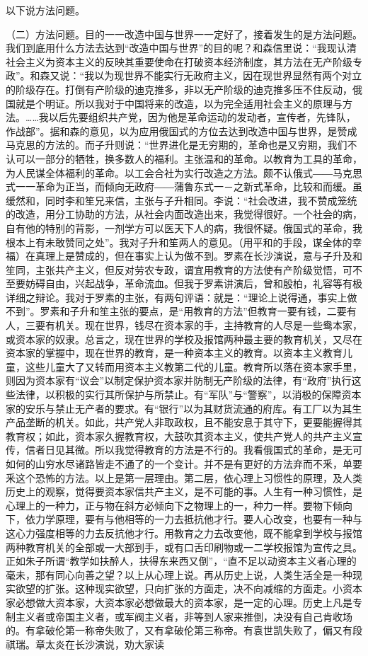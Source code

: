 以下说方法问题。

（二）方法问题。目的一一改造中国与世界一一定好了，接着发生的是方法问题。我们到底用什么方法去达到“改造中国与世界”的目的呢？和森信里说：“我现认清社会主义为资本主义的反映其重要使命在打破资本经济制度，其方法在无产阶级专政”。和森又说：“我以为现世界不能实行无政府主义，因在现世界显然有两个对立的阶级存在。打倒有产阶级的迪克推多，非以无产阶级的迪克推多压不住反动，俄国就是个明证。所以我对于中国将来的改造，以为完全适用社会主义的原理与方法。……我以后先要组织共产党，因为他是革命运动的发动者，宣传者，先锋队，作战部”。据和森的意见，以为应用俄国式的方位去达到改造中国与世界，是赞成马克思的方法的。而子升则说：“世界进化是无穷期的，革命也是又穷期，我们不认可以一部分的牺牲，换多数人的福利。主张温和的革命。以教育为工具的革命，为人民谋全体福利的革命。以工会合社为实行改造之方法。颇不认俄式――马克思式一一革命为正当，而倾向无政府――蒲鲁东式一－之新式革命，比较和而缓。虽缓然和，同时李和笙兄来信，主张与子升相同。李说：“社会改进，我不赞成笼统的改造，用分工协助的方法，从社会内面改造出来，我觉得很好。一个社会的病，自有他的特别的背影，一剂学方可以医天下人的病，我很怀疑。俄国式的革命，我根本上有未敢赞同之处”。我对子升和笙两人的意见。（用平和的手段，谋全体的幸福）在真理上是赞成的，但在事实上认为做不到。罗素在长沙演说，意与子升及和笙同，主张共产主义，但反对劳农专政，谓宜用教育的方法使有产阶级觉悟，可不至要妨碍自由，兴起战争，革命流血。但我于罗素讲演后，曾和殷柏，礼容等有极详细之辩论。我对于罗素的主张，有两句评语：就是：“理论上说得通，事实上做不到”。罗素和子升和笙主张的要点，是“用教育的方法”但教育一要有钱，二要有人，三要有机关。现在世界，钱尽在资本家的手，主持教育的人尽是一些鸯本家，或资本家的奴隶。总言之，现在世界的学校及报馆两种最主要的教育机关，又尽在资本家的掌握中，现在世界的教育，是一种资本主义的教育。以资本主义教育儿童，这些儿童大了又转而用资本主义教第二代的儿童。教育所以落在资本家手里，则因为资本家有“议会”以制定保护资本家并防制无产阶级的法律，有“政府”执行这些法律，以积极的实行其所保护与所禁止。有“军队”与“警察”，以消极的保障资本家的安乐与禁止无产者的要求。有“银行”以为其财货流通的府库。有工厂以为其生产品垄断的机关。如此，共产党人非取政权，且不能安息于其守下，更要能握得其教育权；如此，资本家久握教育权，大鼓吹其资本主义，使共产党人的共产主义宣传，信者日见其微。所以我觉得教育的方法是不行的。我看俄国式的革命，是无可如何的山穷水尽诸路皆走不通了的一个变计。并不是有更好的方法弃而不釆，单要釆这个恐怖的方法。以上是第一层理由。第二层，依心理上习惯性的原理，及人类历史上的观察，觉得要资本家信共产主义，是不可能的事。人生有一种习惯性，是心理上的一种力，正与物在斜方必倾向下之物理上的一，种力一样。要物下倾向下，依力学原理，要有与他相等的一力去抵抗他才行。要人心改变，也要有一种与这心力强度相等的力去反抗他才行。用教育之力去改变他，既不能拿到学校与报馆两种教育机关的全部或一大部到手，或有口舌印刷物或一二学校报馆为宣传之具。正如朱子所谓“教学如扶醉人，扶得东来西又倒”，“直不足以动资本主义者心理的毫未，那有同心向善之望？以上从心理上说。再从历史上说，人类生活全是一种现实欲望的扩张。这种现实欲望，只向扩张的方面走，决不向减缩的方面走。小资本家必想做大资本家，大资本家必想做最大的资本家，是一定的心理。历史上凡是专制主义者或帝国主义者，或军阀主义者，非等到人家来推倒，决没有自己肯收场的。有拿破伦第一称帝失败了，又有拿破伦第三称帝。有袁世凯失败了，偏又有段祺瑞。章太炎在长沙演说，劝大家读